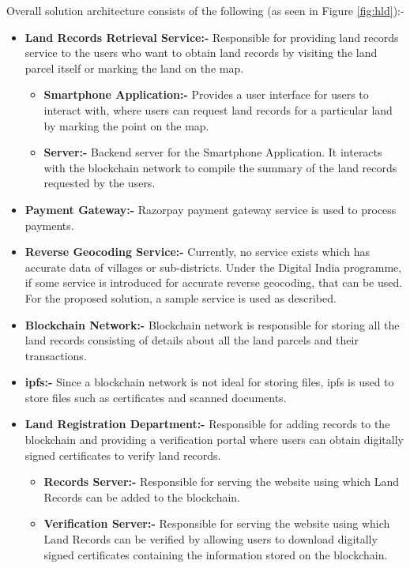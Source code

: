 \documentclass[12pt]{article}
\begin{document}
    Overall solution architecture consists of the following (as seen in Figure \ref{fig:hld}):-
    \begin{itemize}
        \item \textbf{Land Records Retrieval Service:-} Responsible for providing land records service to the users who want to obtain land records by visiting the land parcel itself or marking the land on the map.
        \begin{itemize}
            \item \textbf{Smartphone Application:-} Provides a user interface for users to interact with, where users can request land records for a particular land by marking the point on the map.
            \item \textbf{Server:-} Backend server for the Smartphone Application. It interacts with the blockchain network to compile the summary of the land records requested by the users.
        \end{itemize}
        \item \textbf{Payment Gateway:-} Razorpay payment gateway service is used to process payments.
        \item \textbf{Reverse Geocoding Service:-} Currently, no service exists which has accurate data of villages or sub-districts. Under the Digital India programme, if some service is introduced for accurate reverse geocoding, that can be used. For the proposed solution, a sample service is used as described.
        \item \textbf{Blockchain Network:-} Blockchain network is responsible for storing all the land records consisting of details about all the land parcels and their transactions.
        \item \textbf{\acrshort{ipfs}:-} Since a blockchain network is not ideal for storing files, \acrshort{ipfs} is used to store files such as certificates and scanned documents.
        \item \textbf{Land Registration Department:-} Responsible for adding records to the blockchain and providing a verification portal where users can obtain digitally signed certificates to verify land records.
        \begin{itemize}
            \item \textbf{Records Server:-} Responsible for serving the website using which Land Records can be added to the blockchain.
            \item \textbf{Verification Server:-} Responsible for serving the website using which Land Records can be verified by allowing users to download digitally signed certificates containing the information stored on the blockchain.
        \end{itemize}  
    \end{itemize}
\end{document}
